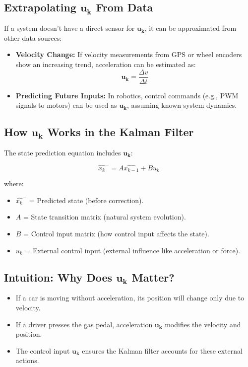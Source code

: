 \documentclass{article}
\begin{document}
\subsection*{Extrapolating \(\mathbf{u_k}\) From Data}
If a system doesn’t have a direct sensor for \(\mathbf{u_k}\), it can be approximated from other data sources:

\begin{itemize}
    \item \textbf{Velocity Change:} If velocity measurements from GPS or wheel encoders show an increasing trend, acceleration can be estimated as:
    \[
    \mathbf{u_k} = \frac{\Delta v}{\Delta t}
    \]
    \item \textbf{Predicting Future Inputs:} In robotics, control commands (e.g., PWM signals to motors) can be used as \(\mathbf{u_k}\), assuming known system dynamics.
\end{itemize}

\subsection*{How \(\mathbf{u_k}\) Works in the Kalman Filter}
The state prediction equation includes \(\mathbf{u_k}\):

\[
\hat{x_k}^- = A \hat{x_{k-1}} + B u_k
\]

where:
\begin{itemize}
    \item \(\hat{x_k}^-\) = Predicted state (before correction).
    \item \(A\) = State transition matrix (natural system evolution).
    \item \(B\) = Control input matrix (how control input affects the state).
    \item \(u_k\) = External control input (external influence like acceleration or force).
\end{itemize}

\subsection*{Intuition: Why Does \(\mathbf{u_k}\) Matter?}
\begin{itemize}
    \item If a car is moving without acceleration, its position will change only due to velocity.
    \item If a driver presses the gas pedal, acceleration \(\mathbf{u_k}\) modifies the velocity and position.
    \item The control input \(\mathbf{u_k}\) ensures the Kalman filter accounts for these external actions.
\end{itemize}
\end{document}
